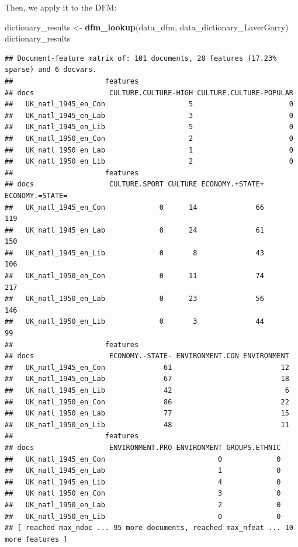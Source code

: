 \documentclass[
]{book}
\newenvironment{Shaded}{\begin{snugshade}}{\end{snugshade}}
\newcommand{\FunctionTok}[1]{\textcolor[rgb]{0.13,0.29,0.53}{\textbf{#1}}}
\newcommand{\NormalTok}[1]{#1}
\newcommand{\OtherTok}[1]{\textcolor[rgb]{0.56,0.35,0.01}{#1}}
\begin{document}
Then, we apply it to the DFM:

\begin{Shaded}
\begin{Highlighting}[]
\NormalTok{dictionary\_results }\OtherTok{\textless{}{-}} \FunctionTok{dfm\_lookup}\NormalTok{(data\_dfm, data\_dictionary\_LaverGarry)}
\NormalTok{dictionary\_results}
\end{Highlighting}
\end{Shaded}

\begin{verbatim}
## Document-feature matrix of: 101 documents, 20 features (17.23% sparse) and 6 docvars.
##                      features
## docs                  CULTURE.CULTURE-HIGH CULTURE.CULTURE-POPULAR
##   UK_natl_1945_en_Con                    5                       0
##   UK_natl_1945_en_Lab                    3                       0
##   UK_natl_1945_en_Lib                    5                       0
##   UK_natl_1950_en_Con                    2                       0
##   UK_natl_1950_en_Lab                    1                       0
##   UK_natl_1950_en_Lib                    2                       0
##                      features
## docs                  CULTURE.SPORT CULTURE ECONOMY.+STATE+ ECONOMY.=STATE=
##   UK_natl_1945_en_Con             0      14              66             119
##   UK_natl_1945_en_Lab             0      24              61             150
##   UK_natl_1945_en_Lib             0       8              43             106
##   UK_natl_1950_en_Con             0      11              74             217
##   UK_natl_1950_en_Lab             0      23              56             146
##   UK_natl_1950_en_Lib             0       3              44              99
##                      features
## docs                  ECONOMY.-STATE- ENVIRONMENT.CON ENVIRONMENT
##   UK_natl_1945_en_Con              61                          12
##   UK_natl_1945_en_Lab              67                          18
##   UK_natl_1945_en_Lib              42                           6
##   UK_natl_1950_en_Con              86                          22
##   UK_natl_1950_en_Lab              77                          15
##   UK_natl_1950_en_Lib              48                          11
##                      features
## docs                  ENVIRONMENT.PRO ENVIRONMENT GROUPS.ETHNIC
##   UK_natl_1945_en_Con                           0             0
##   UK_natl_1945_en_Lab                           1             0
##   UK_natl_1945_en_Lib                           4             0
##   UK_natl_1950_en_Con                           3             0
##   UK_natl_1950_en_Lab                           2             0
##   UK_natl_1950_en_Lib                           0             0
## [ reached max_ndoc ... 95 more documents, reached max_nfeat ... 10 more features ]
\end{verbatim}
\end{document}
